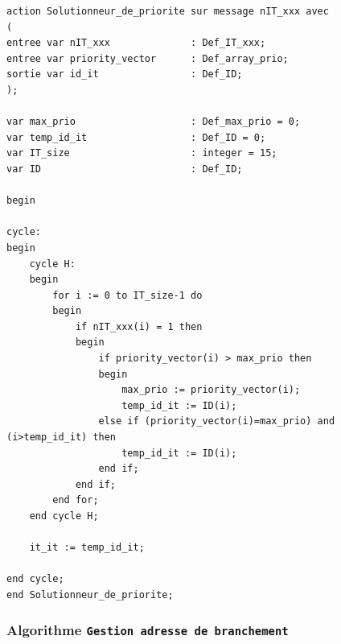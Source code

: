 \begin{lstlisting}[style=pascalstyle]
action Solutionneur_de_priorite sur message nIT_xxx avec
(
entree var nIT_xxx 				: Def_IT_xxx;
entree var priority_vector 		: Def_array_prio;
sortie var id_it 				: Def_ID;
);

var max_prio 					: Def_max_prio = 0;
var temp_id_it 					: Def_ID = 0;
var IT_size 					: integer = 15;
var ID 							: Def_ID;

begin

cycle:
begin
	cycle H:
	begin
		for i := 0 to IT_size-1 do
		begin
			if nIT_xxx(i) = 1 then
			begin
				if priority_vector(i) > max_prio then
				begin
					max_prio := priority_vector(i);
					temp_id_it := ID(i);
				else if (priority_vector(i)=max_prio) and (i>temp_id_it) then
					temp_id_it := ID(i);
				end if;	
			end if;
		end for;
	end cycle H;

	it_it := temp_id_it;

end cycle;
end Solutionneur_de_priorite;
\end{lstlisting}

\subsubsection{Algorithme \texttt{Gestion adresse de branchement}}